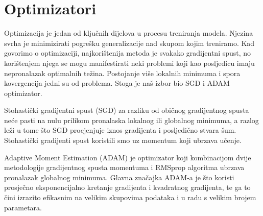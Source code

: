 \section{Optimizatori}

Optimizacija je jedan od ključnih dijelova u procesu treniranja modela. Njezina svrha je minimizirati pogrešku generalizacije nad skupom kojim treniramo.
Kad govorimo o optimizaciji, najkorištenija metoda je svakako gradijentni spust, no korištenjem njega se mogu manifestirati neki problemi koji kao posljedicu imaju nepronalazak optimalnih težina. Postojanje više lokalnih minimuma i spora kovergencija jedni su od problema. Stoga je naš izbor bio SGD i ADAM optimizator. 

Stohastički gradijentni spust (SGD) za razliku od običnog gradijentnog spusta neće pasti na nulu prilikom pronalaska lokalnog ili globalnog minimuma, a razlog leži u tome što SGD procjenjuje iznos gradijenta i posljedično stvara šum.
Stohastički gradijenti spust koristili smo uz momentum koji ubrzava učenje. 

Adaptive Moment Estimation (ADAM) je optimizator koji kombinacijom dvije metodologije gradijentnog spusta momentuma i RMSprop algoritma ubrzava pronalazak globalnog minimuma. Glavna značajka ADAM-a je što koristi prosječno eksponencijalno kretanje gradijenta i kvadratnog gradijenta, te ga to čini izrazito efikasnim na velikim skupovima podataka i
u radu s velikim brojem parametara. 